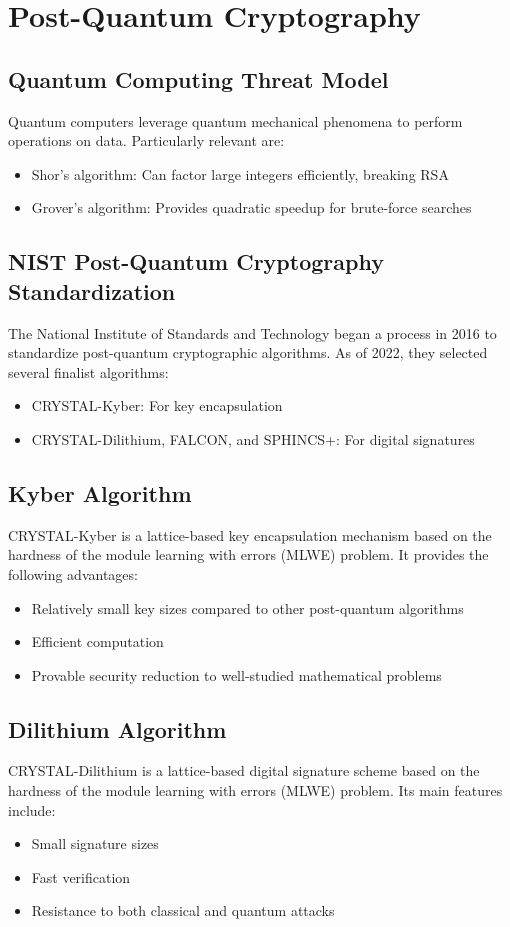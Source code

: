 \documentclass[12pt,a4paper]{report}
\begin{document}
\section{Post-Quantum Cryptography}
\subsection{Quantum Computing Threat Model}
Quantum computers leverage quantum mechanical phenomena to perform operations on data. Particularly relevant are:
\begin{itemize}
    \item Shor's algorithm: Can factor large integers efficiently, breaking RSA
    \item Grover's algorithm: Provides quadratic speedup for brute-force searches
\end{itemize}

\subsection{NIST Post-Quantum Cryptography Standardization}
The National Institute of Standards and Technology began a process in 2016 to standardize post-quantum cryptographic algorithms. As of 2022, they selected several finalist algorithms:
\begin{itemize}
    \item CRYSTAL-Kyber: For key encapsulation
    \item CRYSTAL-Dilithium, FALCON, and SPHINCS+: For digital signatures
\end{itemize}

\subsection{Kyber Algorithm}
CRYSTAL-Kyber is a lattice-based key encapsulation mechanism based on the hardness of the module learning with errors (MLWE) problem. It provides the following advantages:
\begin{itemize}
    \item Relatively small key sizes compared to other post-quantum algorithms
    \item Efficient computation
    \item Provable security reduction to well-studied mathematical problems
\end{itemize}

\subsection{Dilithium Algorithm}
CRYSTAL-Dilithium is a lattice-based digital signature scheme based on the hardness of the module learning with errors (MLWE) problem. Its main features include:
\begin{itemize}
    \item Small signature sizes
    \item Fast verification
    \item Resistance to both classical and quantum attacks
\end{itemize}
\end{document}
